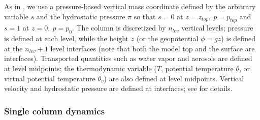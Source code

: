 %

As in \cite{Taylor2020}, we use a pressure-based vertical mass coordinate defined by the arbitrary variable $s$ and the hydrostatic pressure $\pi$ so that $s=0$ at $z=z_{top},~p= p_{top}$ and $s=1$ at $z=0,~p=p_0$.
The column is discretized by $n_{lev}$ vertical levels; pressure is defined at each level, while the height $z$ (or the geopotential $\phi=gz$) is defined at the $n_{lev}+1$ level interfaces (note that both the model top and the surface are interfaces).
Transported quantities such as water vapor and aerosols are defined at level midpoints; the thermodynamic variable ($T$, potential temperature $\theta$, or virtual potential temperature $\theta_v$) are also defined at level midpoints.
Vertical velocity and hydrostatic pressure are defined at interfaces; see \cite{Taylor2020} for details.


\subsubsection{Single column dynamics}

